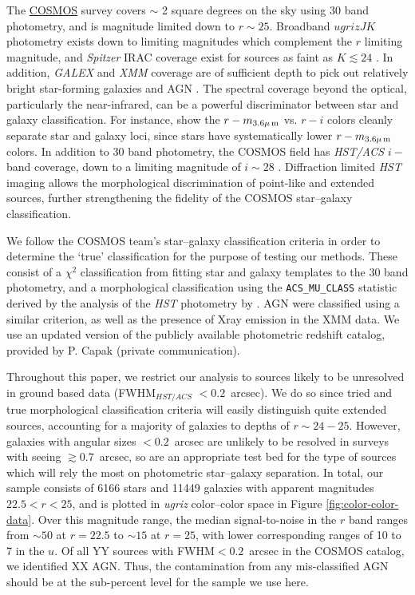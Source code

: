 \documentclass[12pt,preprint]{aastex}
\begin{document}
The \href{http://cosmos.astro.caltech.edu/}{COSMOS} survey \citep{scoville07a} covers $\sim$ 2 square degrees on
the sky using 30 band photometry, and is magnitude limited down to $r
\sim 25$.  Broadband $ugrizJK$ photometry exists down to limiting
magnitudes which complement the $r$ limiting magnitude, and {\it
  Spitzer} IRAC coverage exist for sources as faint as $K\lesssim24$ 
  \citep{capak07,sanders07,taniguchi07}.
In addition, {\it GALEX} and {\it XMM} coverage are of sufficient
depth to pick out relatively bright star-forming galaxies and AGN 
\citep{hasinger07,zamojski07}.
The spectral coverage beyond the optical, particularly the
near-infrared, can be a powerful discriminator between star and
galaxy classification.  For instance, \citet{ilbert09} show the
$r-m_{\rm 3.6\mu\,m}$ vs. $r-i$ colors cleanly separate star and
galaxy loci, since stars have systematically lower $r-m_{\rm
  3.6\mu\,m}$ colors.  In addition to 30 band photometry, the COSMOS
field has \textit{HST/ACS} $i-$band coverage, down to a limiting
magnitude of $i\sim28$ \citep{koekemoer07,scoville07b}.  Diffraction
limited \textit{HST} imaging allows the morphological discrimination
of point-like and extended sources, further strengthening the fidelity
of the COSMOS star--galaxy classification.

We follow the COSMOS team's star--galaxy classification criteria 
in order to determine the `true' classification for the purpose of 
testing our methods.  These consist of a $\chi^2$ classification 
from fitting star and galaxy templates to the 30 band photometry, 
and a morphological classification using the 
{\tt ACS\_MU\_CLASS} statistic derived by the analysis of the 
\textit{HST} photometry by \citet{scarlata07}.  AGN were classified 
using a similar criterion, as well as the presence of Xray emission 
in the {XMM} data.  We use an updated version of the publicly 
available photometric redshift catalog, provided by P. Capak 
(private communication).  

Throughout this paper, we restrict our analysis to sources likely to
be unresolved in ground based data (FWHM$_{HST/ACS}$ $< 0.2$~arcsec).  We
do so since tried and true morphological classification criteria will
easily distinguish quite extended sources, accounting for a majority
of galaxies to depths of $r\sim24-25$.  However, galaxies with angular
sizes $< 0.2$~arcsec are unlikely to be resolved in surveys with seeing
$\gtrsim0.7$~arcsec, so are an appropriate test bed for the type of sources
which will rely the most on photometric star--galaxy separation.  In
total, our sample consists of 6166 stars and 11449 galaxies with apparent 
magnitudes $22.5<r<25$, and is plotted in {\it ugriz} color--color space in
Figure \ref{fig:color-color-data}.   Over this magnitude range, the median 
signal-to-noise in the $r$ band ranges from $\sim50$ at $r=22.5$ to 
$\sim15$ at $r=25$, with lower corresponding ranges of 10 to 7 in the $u$.  
Of all YY sources with FWHM$<0.2$~arcsec in the COSMOS catalog, we 
identified XX AGN.  Thus, the contamination from any mis-classified AGN 
should be at the sub-percent level for the sample we use here.
\end{document}
